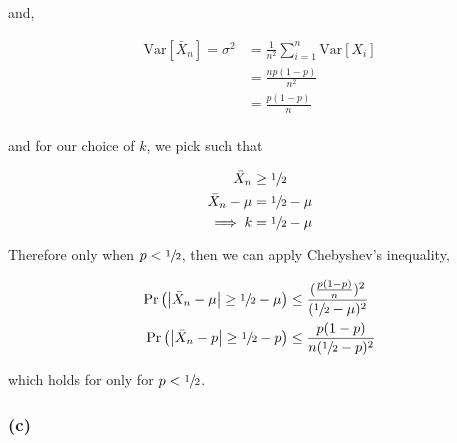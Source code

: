 \documentclass[letterpaper,10pt]{article} %
\newcommand{\pr}[1]{\Pr\left( #1 \right)}
\begin{document}
and,

\begin{align*}
\mathrm{Var}\left[ \bar{X}_n \right] = \sigma^2 &= \frac{1}{n^2} \sum_{i=1}^n\mathrm{Var}\left[X_i \right] \\
&= \frac{np(1-p)}{n^2} \\
&= \frac{p(1-p)}{n} \\
\end{align*}

and for our choice of $k$, we pick such that

\begin{align*}
\bar{X}_n &\geq \sfrac{1}{2} \\
\bar{X}_n - \mu &= \sfrac{1}{2} - \mu \\
\implies k &= \sfrac{1}{2}-\mu \\
\end{align*}

Therefore only when $p < \sfrac{1}{2}$, then we can apply Chebyshev's inequality,

\begin{align*}
\pr{\left|\bar{X}_n - \mu \right| \geq \sfrac{1}{2}-\mu} &\leq \frac{(\frac{p(1-p)}{n})^2}{(\sfrac{1}{2}-\mu)^2}\\
\pr{\left|\bar{X}_n - p\right| \geq \sfrac{1}{2}-p} &\leq \frac{p(1-p)}{n(\sfrac{1}{2}-p)^2} \\
\end{align*}

which holds for only for $p<\sfrac{1}{2}$.

\subsubsection*{(c)}



%
%

\end{document}

